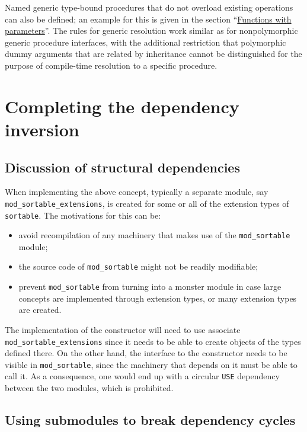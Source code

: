 \documentclass[
]{article}
\providecommand{\tightlist}{%
  \setlength{\itemsep}{0pt}\setlength{\parskip}{0pt}}
\begin{document}
Named generic type-bound procedures that do not overload existing
operations can also be defined; an example for this is given in the
section ``\hyperref[sec:functions_with_parameters]{Functions with
parameters}''. The rules for generic resolution work similar as for
nonpolymorphic generic procedure interfaces, with the additional
restriction that polymorphic dummy arguments that are related by
inheritance cannot be distinguished for the purpose of compile-time
resolution to a specific procedure.

\section{Completing the dependency
inversion}\label{completing-the-dependency-inversion}

\subsection{Discussion of structural
dependencies}\label{discussion-of-structural-dependencies}

When implementing the above concept, typically a separate module, say
\texttt{mod\_sortable\_extensions}, is created for some or all of the
extension types of \texttt{sortable}. The motivations for this can be:

\begin{itemize}
\tightlist
\item
  avoid recompilation of any machinery that makes use of the
  \texttt{mod\_sortable} module;
\item
  the source code of \texttt{mod\_sortable} might not be readily
  modifiable;
\item
  prevent \texttt{mod\_sortable} from turning into a monster module in
  case large concepts are implemented through extension types, or many
  extension types are created.
\end{itemize}

The implementation of the constructor will need to use associate
\texttt{mod\_sortable\_extensions} since it needs to be able to create
objects of the types defined there. On the other hand, the interface to
the constructor needs to be visible in \texttt{mod\_sortable}, since the
machinery that depends on it must be able to call it. As a consequence,
one would end up with a circular \texttt{USE} dependency between the two
modules, which is prohibited.

\subsection{Using submodules to break dependency
cycles}\label{using-submodules-to-break-dependency-cycles}
\end{document}
